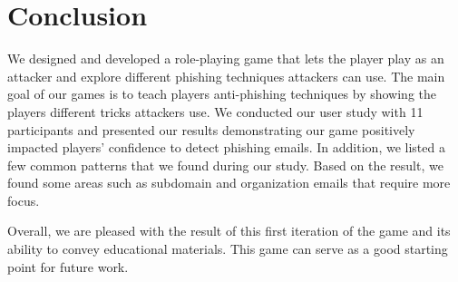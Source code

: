 \section{Conclusion}
We designed and developed a role-playing game that lets the player play as an attacker and explore different phishing techniques attackers can use. The main goal of our games is to teach players anti-phishing techniques by showing the players different tricks attackers use. We conducted our user study with 11 participants and presented our results demonstrating our game positively impacted players' confidence to detect phishing emails. In addition, we listed a few common patterns that we found during our study. Based on the result, we found some areas such as subdomain and organization emails that require more focus.

Overall, we are pleased with the result of this first iteration of the game and its ability to convey educational materials. This game can serve as a good starting point for future work.